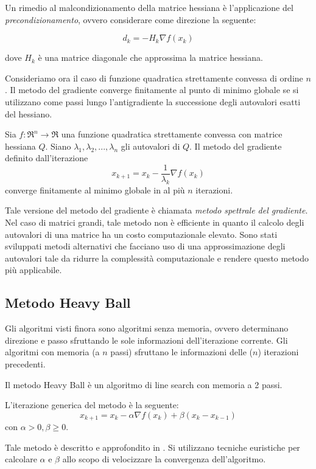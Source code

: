 Un rimedio al malcondizionamento della matrice hessiana è l'applicazione del \textit{precondizionamento}, ovvero considerare come direzione la seguente:

\begin{equation}
  \label{eqn:methods.gradient.preconditioning}
  d_{k}=-H_{k}\nabla f(x_{k})
\end{equation}

dove $H_{k}$ è una matrice diagonale che approssima la matrice hessiana.

Consideriamo ora il caso di funzione quadratica strettamente convessa di ordine $n$. Il metodo del gradiente converge finitamente al punto di minimo globale se si utilizzano come passi lungo l'antigradiente la successione degli autovalori esatti del hessiano.

\begin{theorem}
  \label{methods.gradient.quadratic}
  Sia $f:\Re^{n}\rightarrow\Re$ una funzione quadratica strettamente convessa con matrice hessiana $Q$. Siano $\lambda_{1},\lambda_{2},...,\lambda_{n}$ gli autovalori di $Q$. Il metodo del gradiente definito dall'iterazione
  \begin{equation}
    \label{eqn:methods.gradient.quadratic}
    x_{k+1}=x_{k}-\frac{1}{\lambda_{k}}\nabla f(x_{k})
  \end{equation}
  converge finitamente al minimo globale in al più $n$ iterazioni.
\end{theorem}

Tale versione del metodo del gradiente è chiamata \textit{metodo spettrale del gradiente}. Nel caso di matrici grandi, tale metodo non è efficiente in quanto il calcolo degli autovalori di una matrice ha un costo computazionale elevato.
Sono stati sviluppati metodi alternativi che facciano uso di una approssimazione degli autovalori tale da ridurre la complessità computazionale e rendere questo metodo più applicabile.



\subsection{Metodo Heavy Ball}
\label{sec:method.heavyball}
Gli algoritmi visti finora sono algoritmi senza memoria, ovvero determinano direzione e passo sfruttando le sole informazioni dell'iterazione corrente. Gli algoritmi con memoria (a $n$ passi) sfruttano le informazioni delle ($n$) iterazioni precedenti.

Il metodo Heavy Ball è un algoritmo di line search con memoria a 2 passi.

L'iterazione generica del metodo è la seguente:
\begin{equation}
  \label{eqn:method.heavyball}
  x_{k+1}=x_{k}-\alpha\nabla f(x_{k})+\beta(x_{k}-x_{k-1})
\end{equation}
con $\alpha>0,\beta\geq0$.

Tale metodo è descritto e approfondito in \cite{poljak1987introduction}.
Si utilizzano tecniche euristiche per calcolare $\alpha$ e $\beta$ allo scopo di velocizzare la convergenza dell'algoritmo.
